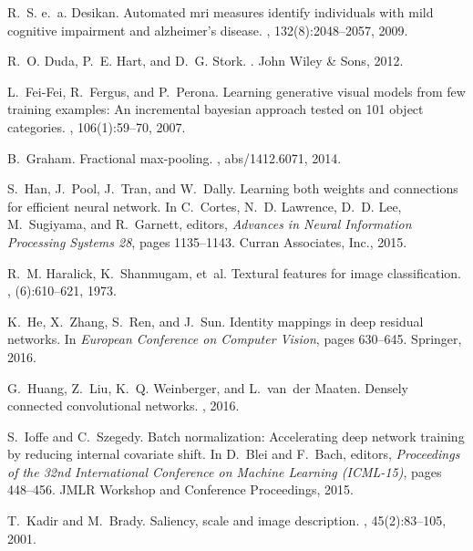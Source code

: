 \documentclass[10pt,onecolumn]{article}
\begin{document}
\begin{thebibliography}{10}
R.~S. e.~a. Desikan.
\newblock Automated mri measures identify individuals with mild cognitive
  impairment and alzheimer's disease.
, 132(8):2048--2057, 2009.

R.~O. Duda, P.~E. Hart, and D.~G. Stork.
.
\newblock John Wiley \& Sons, 2012.

L.~Fei-Fei, R.~Fergus, and P.~Perona.
\newblock Learning generative visual models from few training examples: An
  incremental bayesian approach tested on 101 object categories.
, 106(1):59--70, 2007.

B.~Graham.
\newblock Fractional max-pooling.
, abs/1412.6071, 2014.

S.~Han, J.~Pool, J.~Tran, and W.~Dally.
\newblock Learning both weights and connections for efficient neural network.
\newblock In C.~Cortes, N.~D. Lawrence, D.~D. Lee, M.~Sugiyama, and R.~Garnett,
  editors, {\em Advances in Neural Information Processing Systems 28}, pages
  1135--1143. Curran Associates, Inc., 2015.

R.~M. Haralick, K.~Shanmugam, et~al.
\newblock Textural features for image classification.
,
  (6):610--621, 1973.

K.~He, X.~Zhang, S.~Ren, and J.~Sun.
\newblock Identity mappings in deep residual networks.
\newblock In {\em European Conference on Computer Vision}, pages 630--645.
  Springer, 2016.

G.~Huang, Z.~Liu, K.~Q. Weinberger, and L.~van~der Maaten.
\newblock Densely connected convolutional networks.
, 2016.

S.~Ioffe and C.~Szegedy.
\newblock Batch normalization: Accelerating deep network training by reducing
  internal covariate shift.
\newblock In D.~Blei and F.~Bach, editors, {\em Proceedings of the 32nd
  International Conference on Machine Learning (ICML-15)}, pages 448--456. JMLR
  Workshop and Conference Proceedings, 2015.

T.~Kadir and M.~Brady.
\newblock Saliency, scale and image description.
, 45(2):83--105, 2001.


\end{thebibliography}
\end{document}
